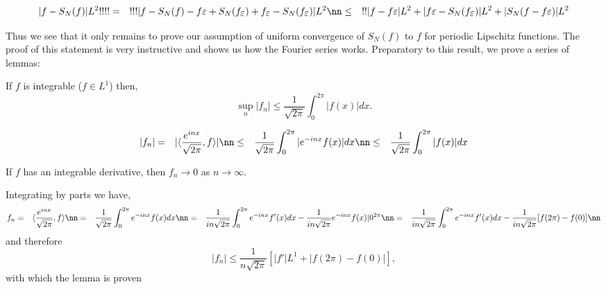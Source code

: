 \begin{eqnarray*} |f-S_N(f)|{L^2} !!!! &=& !!! |f-S_N(f) - f{\eps} + S_N(f_{\eps}) + f_{\eps} - S_N(f_{\eps}) |{L^2} \nn &\leq&!!
|f-f{\eps}|{L^2} + |f{\eps}-S_N(f_{\eps})|{L^2} + |S_N(f-f{\eps})|{L^2} \end{eqnarray*} %

Thus we see that it only remains to prove our assumption of uniform convergence of $S_N(f)$ to $f$ for periodic Lipschitz functions. The proof of this statement is very instructive and shows us how the Fourier series works. Preparatory to this result, we prove a series of lemmas:

\blem If $f$ is integrable ($f \in L^1$) then, \begin{equation} \sup_n{|f_n|} \leq \frac{1}{\sqrt{2\pi}} \int_0^{2\pi}|f(x)| dx. \end{equation} \elem

\bpru \begin{eqnarray} |f_n| &=& |\langle \frac{e^{inx}}{\sqrt{2\pi}},f \rangle | \nn &\leq& \frac{1}{\sqrt{2\pi}}\int_0^{2\pi}|e^{-inx}f(x)|dx \nn &\leq& \frac{1}{\sqrt{2\pi}}\int_0^{2\pi}|f(x)|dx \end{eqnarray} \epru

\blem If $f$ has an integrable derivative, then $f_n \to 0$ as $n \to \infty$. \elem

\bpru Integrating by parts we have, \begin{eqnarray*} f_n &=& \langle \frac{e^{inx}}{\sqrt{2\pi}},f \rangle \nn &=& \frac{1}{\sqrt{2\pi}}\int_0^{2\pi} e^{-inx}f(x)dx \nn &=& \frac{1}{in\sqrt{2\pi}}\int_0^{2\pi} e^{-inx}f'(x)dx -\frac{1}{in\sqrt{2\pi}}e^{-inx}f(x)|0^{2\pi} \nn &=& \frac{1}{in\sqrt{2\pi}}\int_0^{2\pi} e^{-inx}f'(x)dx -\frac{1}{in\sqrt{2\pi}}[f(2\pi)-f(0)] \nn \end{eqnarray*} and therefore \begin{equation} |f_n| \leq \frac{1}{n\sqrt{2\pi}}[|f'|{L^1} + |f(2\pi)-f(0)|], \end{equation} with which the lemma is proven \epru

